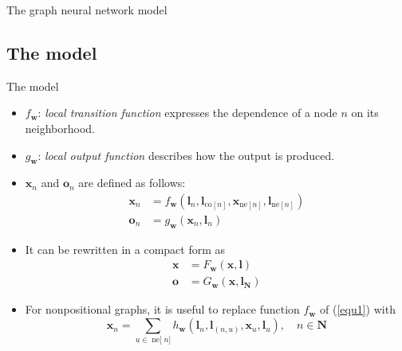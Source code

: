 \documentclass[10pt,aspectratio=169]{beamer}
\begin{document}
\begin{frame}[allowframebreaks]{The graph neural network model}
\end{frame}

\subsection{The model}
\begin{frame}[allowframebreaks]{The model}

    \begin{itemize}
        \item $f_{\boldsymbol{w}}$: \emph{local transition function} expresses the dependence of a node $n$ on its neighborhood.
        \item $g_{\boldsymbol{w}}$: \emph{local output function} describes how the output is produced.
        \item $\boldsymbol{x}_n$ and $\boldsymbol{o}_{n}$ are defined as follows:
              \begin{equation}
                  \label{equ1}
                  \begin{aligned}
                      \boldsymbol{x}_{n} & =f_{\boldsymbol{w}}\left(\boldsymbol{l}_{n}, \boldsymbol{l}_{\mathrm{co}[n]}, \boldsymbol{x}_{\mathrm{ne}[n]}, \boldsymbol{l}_{\mathrm{ne}[n]}\right) \\
                      \boldsymbol{o}_{n} & =g_{\boldsymbol{w}}\left(\boldsymbol{x}_{n}, \boldsymbol{l}_{n}\right)
                  \end{aligned}
              \end{equation}
    \end{itemize}

    \framebreak

    \begin{itemize}
        \item It can be rewritten in a compact form as
              \begin{equation}
                  \label{equ2}
                  \begin{aligned}
                      \boldsymbol{x} & =F_{\boldsymbol{w}}(\boldsymbol{x}, \boldsymbol{l})                             \\
                      \boldsymbol{o} & =G_{\boldsymbol{w}}\left(\boldsymbol{x}, \boldsymbol{l}_{\boldsymbol{N}}\right)
                  \end{aligned}
              \end{equation}
        \item For nonpositional graphs, it is useful to replace function $f_{\boldsymbol{w}}$
              of (\ref{equ1}) with
              \begin{equation}
                  \label{equ3}
                  \boldsymbol{x}_{n}=\sum_{u \in \operatorname{ne[} n]} h_{\boldsymbol{w}}\left(\boldsymbol{l}_{n}, \boldsymbol{l}_{(n, u)}, \boldsymbol{x}_{u}, \boldsymbol{l}_{u}\right), \quad n \in \boldsymbol{N}
              \end{equation}
    \end{itemize}


\end{frame}
\end{document}
